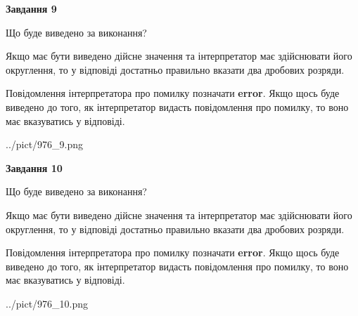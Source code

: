 \documentclass[12pt, ukrainian]{article}
\begin{document}
{\begin {Large}
{\begin {center}\textbf{Завдання 9}\end {center}}\par
Що буде виведено за виконання? \par

Якщо має бути виведено дійсне значення та інтерпретатор має здійснювати його округлення, 
то у відповіді достатньо правильно вказати два дробових розряди.

Повідомлення інтерпретатора про помилку позначати \textbf{error}.
Якщо щось буде виведено до того, як інтерпретатор видасть повідомлення про помилку, 
то воно має вказуватись у відповіді. \par

\begin{center}
	{../pict/976_9.png}
\end{center}
\newpage

{\begin {center}\textbf{Завдання 10}\end {center}}\par
Що буде виведено за виконання? \par

Якщо має бути виведено дійсне значення та інтерпретатор має здійснювати його округлення, 
то у відповіді достатньо правильно вказати два дробових розряди.

Повідомлення інтерпретатора про помилку позначати \textbf{error}.
Якщо щось буде виведено до того, як інтерпретатор видасть повідомлення про помилку, 
то воно має вказуватись у відповіді. \par

\begin{center}
	{../pict/976_10.png}
\end{center}
\newpage

\end {Large}}
\end{document}
